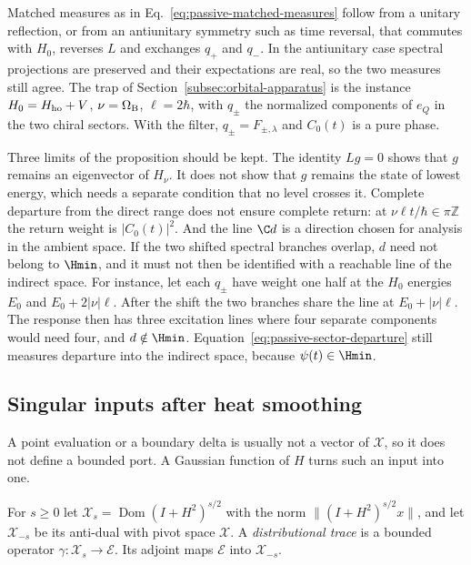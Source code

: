 Matched measures as in Eq.~\eqref{eq:passive-matched-measures} follow from a unitary reflection, or from an antiunitary symmetry such as time reversal, that commutes with $H_0$, reverses $L$ and exchanges $q_+$ and $q_-$. In the antiunitary case spectral projections are preserved and their expectations are real, so the two measures still agree. The trap of Section~\ref{subsec:orbital-apparatus} is the instance $H_0=H_{\rm ho}+V$, $\nu=\Omega_{\rm B}$, $\ell=2\hbar$, with $q_\pm$ the normalized components of $e_Q$ in the two chiral sectors. With the filter, $q_\pm=F_{\pm,\lambda}$ and $C_0(t)$ is a pure phase.

Three limits of the proposition should be kept. The identity $Lg=0$ shows that $g$ remains an eigenvector of $H_\nu$. It does not show that $g$ remains the state of lowest energy, which needs a separate condition that no level crosses it. Complete departure from the direct range does not ensure complete return: at $\nu\ell t/\hbar\in\pi\mathbb Z$ the return weight is $|C_0(t)|^2$. And the line $\C d$ is a direction chosen for analysis in the ambient space. If the two shifted spectral branches overlap, $d$ need not belong to $\Hmin$, and it must not then be identified with a reachable line of the indirect space. For instance, let each $q_\pm$ have weight one half at the $H_0$ energies $E_0$ and $E_0+2|\nu|\ell$. After the shift the two branches share the line at $E_0+|\nu|\ell$. The response then has three excitation lines where four separate components would need four, and $d\notin\Hmin$. Equation~\eqref{eq:passive-sector-departure} still measures departure into the indirect space, because $\psi(t)\in\Hmin$.

\subsection{Singular inputs after heat smoothing}
\label{subsec:passive-heat}

A point evaluation or a boundary delta is usually not a vector of $\mathcal X$, so it does not define a bounded port. A Gaussian function of $H$ turns such an input into one.

For $s\ge0$ let $\mathcal X_s=\operatorname{Dom}(I+H^2)^{s/2}$ with the norm $\|(I+H^2)^{s/2}x\|$, and let $\mathcal X_{-s}$ be its anti-dual with pivot space $\mathcal X$. A \emph{distributional trace} is a bounded operator $\gamma:\mathcal X_s\to\mathcal E$. Its adjoint maps $\mathcal E$ into $\mathcal X_{-s}$.

